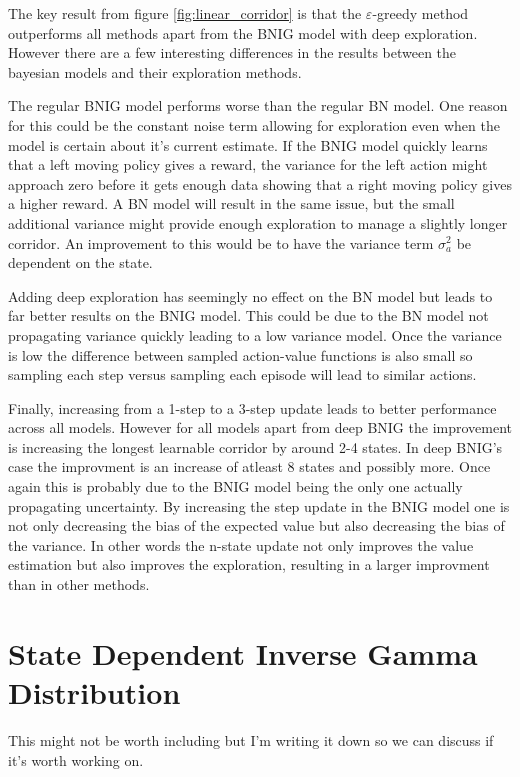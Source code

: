 The key result from figure \ref{fig:linear_corridor} is that the $\varepsilon$-greedy method outperforms all methods apart from the BNIG model with deep exploration. However there are a few interesting differences in the results between the bayesian models and their exploration methods. 

The regular BNIG model performs worse than the regular BN model. One reason for this could be the constant noise term allowing for exploration even when the model is certain about it's current estimate. If the BNIG model quickly learns that a left moving policy gives a reward, the variance for the left action might approach zero before it gets enough data showing that a right moving policy gives a higher reward. A BN model will result in the same issue, but the small additional variance might provide enough exploration to manage a slightly longer corridor. An improvement to this would be to have the variance term $\sigma_a^2$ be dependent on the state.

Adding deep exploration has seemingly no effect on the BN model but leads to far better results on the BNIG model. This could be due to the BN model not propagating variance quickly leading to a low variance model. Once the variance is low the difference between sampled action-value functions is also small so sampling each step versus sampling each episode will lead to similar actions.

Finally, increasing from a 1-step to a 3-step update leads to better performance across all models. However for all models apart from deep BNIG the improvement is increasing the longest learnable corridor by around 2-4 states. In deep BNIG's case the improvment is an increase of atleast 8 states and possibly more. Once again this is probably due to the BNIG model being the only one actually propagating uncertainty. By increasing the step update in the BNIG model one is not only decreasing the bias of the expected value but also decreasing the bias of the variance. In other words the n-state update not only improves the value estimation but also improves the exploration, resulting in a larger improvment than in other methods.

\section{\color{red}{Temp?} \color{black} State Dependent Inverse Gamma Distribution}

\todo This might not be worth including but I'm writing it down so we can discuss if it's worth working on.

